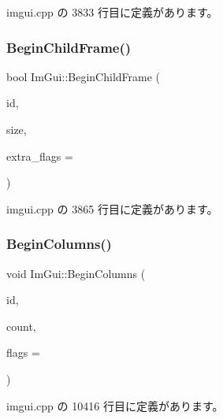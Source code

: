  imgui.\+cpp の 3833 行目に定義があります。

\mbox{\label{namespace_im_gui_a26d6981a769d3fbe9be9a25975b5dc6b}} 
\subsubsection{\texorpdfstring{Begin\+Child\+Frame()}{BeginChildFrame()}}
{\footnotesize\ttfamily bool Im\+Gui\+::\+Begin\+Child\+Frame (\begin{DoxyParamCaption}\item[{\mbox{\hyperlink{imgui_8h_a1785c9b6f4e16406764a85f32582236f}{Im\+Gui\+ID}}}]{id,  }\item[{const \mbox{\hyperlink{struct_im_vec2}{Im\+Vec2}} \&}]{size,  }\item[{\mbox{\hyperlink{imgui_8h_a0b8e067ab4f7a818828c8d89e531addc}{Im\+Gui\+Window\+Flags}}}]{extra\+\_\+flags = {} }\end{DoxyParamCaption})}



 imgui.\+cpp の 3865 行目に定義があります。

\mbox{\label{namespace_im_gui_a4b0c247a5d091c5921c58de6bc8215aa}} 
\subsubsection{\texorpdfstring{Begin\+Columns()}{BeginColumns()}}
{\footnotesize\ttfamily void Im\+Gui\+::\+Begin\+Columns (\begin{DoxyParamCaption}\item[{const char $\ast$}]{id,  }\item[{int}]{count,  }\item[{\mbox{\hyperlink{imgui_8h_a0edb3053546fcf6c5f7dcb7531c3a17a}{Im\+Gui\+Columns\+Flags}}}]{flags = {} }\end{DoxyParamCaption})}



 imgui.\+cpp の 10416 行目に定義があります。

\mbox{\label{namespace_im_gui_a08acc516e0de3cbb99f00774778a440a}} 
